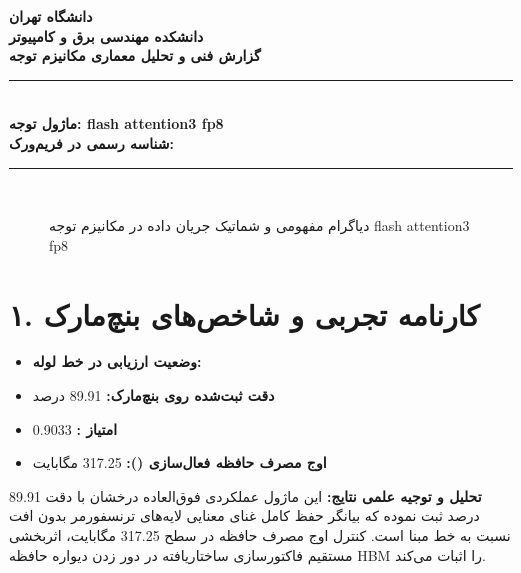 \documentclass[12pt,a4paper]{article}
\begin{document}
\begin{center}
{\Large\bfseries دانشگاه تهران}\\[0.2cm]
{\large\bfseries دانشکده مهندسی برق و کامپیوتر}\\[0.2cm]
{\large\bfseries گزارش فنی و تحلیل معماری مکانیزم توجه}\\[0.5cm]
\rule{\linewidth}{1pt}\\[0.3cm]
{\LARGE\bfseries ماژول توجه: flash attention3 fp8}\\[0.2cm]
{\large \textbf{شناسه رسمی در فریم‌ورک:} }\\[0.2cm]
\rule{\linewidth}{1pt}\\[0.5cm]
\end{center}

\begin{figure}[H]
\centering
{}
\caption{دیاگرام مفهومی و شماتیک جریان داده در مکانیزم توجه flash attention3 fp8}
\end{figure}

\section*{۱. کارنامه تجربی و شاخص‌های بنچ‌مارک}
\begin{itemize}
\item \textbf{وضعیت ارزیابی در خط لوله:} 
\item \textbf{دقت ثبت‌شده روی بنچ‌مارک:} 89.91 درصد
\item \textbf{امتیاز :} 0.9033
\item \textbf{اوج مصرف حافظه فعال‌سازی ():} 317.25 مگابایت
\end{itemize}
\textbf{تحلیل و توجیه علمی نتایج:} این ماژول عملکردی فوق‌العاده درخشان با دقت 89.91 درصد ثبت نموده که بیانگر حفظ کامل غنای معنایی لایه‌های ترنسفورمر بدون افت نسبت به خط مبنا است. کنترل اوج مصرف حافظه در سطح 317.25 مگابایت، اثربخشی مستقیم فاکتورسازی ساختاریافته در دور زدن دیواره حافظه HBM را اثبات می‌کند.
\end{document}
